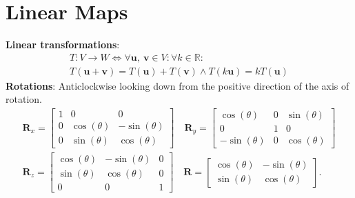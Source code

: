 \documentclass{article}
\begin{document}
\begin{minipage}[t]{126.1962963mm}
    \section*{Linear Maps}
    \textbf{Linear transformations}:
    \begin{gather*}
        T:V\rightarrow W \iff \forall \symbf{u},\: \symbf{v} \in V:\forall k \in \mathbb{R}: \\
        T\left(\symbf{u}+\symbf{v}\right) = T\left(\symbf{u}\right) + T\left(\symbf{v}\right) \wedge T\left(k\symbf{u}\right) = kT\left(\symbf{u}\right)
    \end{gather*}
    \textbf{Rotations}: Anticlockwise looking down from the positive direction of the
    axis of rotation.
    \begin{align*}
        \symbf{R}_x =
        \begin{bmatrix}
            1 & 0                           & 0                            \\
            0 & \cos{\left( \theta \right)} & -\sin{\left( \theta \right)} \\
            0 & \sin{\left( \theta \right)} & \cos{\left( \theta \right)}
        \end{bmatrix}
        \quad \symbf{R}_y =
        \begin{bmatrix}
            \cos{\left( \theta \right)}  & 0 & \sin{\left( \theta \right)} \\
            0                            & 1 & 0                           \\
            -\sin{\left( \theta \right)} & 0 & \cos{\left( \theta \right)}
        \end{bmatrix} \\
        \symbf{R}_z =
        \begin{bmatrix}
            \cos{\left( \theta \right)} & -\sin{\left( \theta \right)} & 0 \\
            \sin{\left( \theta \right)} & \cos{\left( \theta \right)}  & 0 \\
            0                           & 0                            & 1
        \end{bmatrix}
        \quad \symbf{R} =
        \begin{bmatrix}
            \cos{\left( \theta \right)} & -\sin{\left( \theta \right)} \\
            \sin{\left( \theta \right)} & \cos{\left( \theta \right)}
        \end{bmatrix}.

\end{align*}
\end{minipage}
\end{document}
